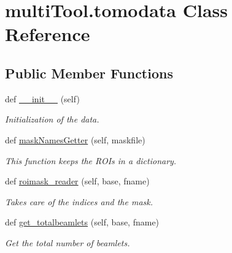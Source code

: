 \hypertarget{classmultiTool_1_1tomodata}{}\section{multi\+Tool.\+tomodata Class Reference}
\label{classmultiTool_1_1tomodata}
\subsection*{Public Member Functions}
\begin{DoxyCompactItemize}
\item 
\mbox{\label{classmultiTool_1_1tomodata_a5afb229515533993e8393b0daefb334c}} 
def \mbox{\hyperlink{classmultiTool_1_1tomodata_a5afb229515533993e8393b0daefb334c}{\+\_\+\+\_\+init\+\_\+\+\_\+}} (self)
\begin{DoxyCompactList}\small\item\em Initialization of the data. \end{DoxyCompactList}\item 
\mbox{\label{classmultiTool_1_1tomodata_abd2f1b1441e3742dfb6bf45033380bab}} 
def \mbox{\hyperlink{classmultiTool_1_1tomodata_abd2f1b1441e3742dfb6bf45033380bab}{mask\+Names\+Getter}} (self, maskfile)
\begin{DoxyCompactList}\small\item\em This function keeps the R\+OI\textquotesingle{}s in a dictionary. \end{DoxyCompactList}\item 
\mbox{\label{classmultiTool_1_1tomodata_a961ebec9c5be04832dc29b65133bca1e}} 
def \mbox{\hyperlink{classmultiTool_1_1tomodata_a961ebec9c5be04832dc29b65133bca1e}{roimask\+\_\+reader}} (self, base, fname)
\begin{DoxyCompactList}\small\item\em Takes care of the indices and the mask. \end{DoxyCompactList}\item 
\mbox{\label{classmultiTool_1_1tomodata_a1f36df9bd821a67b9fca6b1bcfbd5a11}} 
def \mbox{\hyperlink{classmultiTool_1_1tomodata_a1f36df9bd821a67b9fca6b1bcfbd5a11}{get\+\_\+totalbeamlets}} (self, base, fname)
\begin{DoxyCompactList}\small\item\em Get the total number of beamlets. \end{DoxyCompactList}\item 

\end{DoxyCompactItemize}
